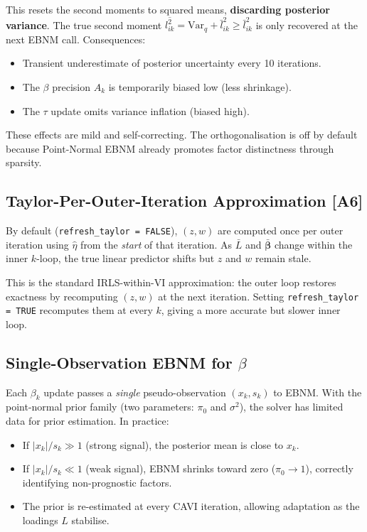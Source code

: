 \documentclass[11pt]{article}
\newcommand{\lbar}[2]{\bar{l}_{#1#2}}
\newcommand{\lsec}[2]{\overline{l^2_{#1#2}}}
\newcommand{\coderef}[1]{{\color{blue!70!black}\texttt{#1}}}
\begin{document}
This resets the second moments to squared means, \textbf{discarding
posterior variance}.  The true second moment
$\lsec{i}{k} = \mathrm{Var}_q + \lbar{i}{k}^2 \geq \lbar{i}{k}^2$
is only recovered at the next EBNM call.  Consequences:
\begin{itemize}[noitemsep]
\item Transient underestimate of posterior uncertainty every 10 iterations.
\item The $\beta$ precision $A_k$ is temporarily biased low (less shrinkage).
\item The $\tau$ update omits variance inflation (biased high).
\end{itemize}

These effects are mild and self-correcting.  The orthogonalisation is
off by default because Point-Normal EBNM already promotes factor
distinctness through sparsity.

\subsection{Taylor-Per-Outer-Iteration Approximation [A6]}

By default (\coderef{refresh\_taylor = FALSE}), $(z, w)$ are computed once
per outer iteration using $\hat{\eta}$ from the \emph{start} of that
iteration.  As $\bar{L}$ and $\bar{\bm{\beta}}$ change within the inner
$k$-loop, the true linear predictor shifts but $z$ and $w$ remain stale.

This is the standard IRLS-within-VI approximation: the outer loop
restores exactness by recomputing $(z, w)$ at the next iteration.
Setting \coderef{refresh\_taylor = TRUE} recomputes them at every $k$,
giving a more accurate but slower inner loop.

\subsection{Single-Observation EBNM for $\beta$}

Each $\beta_k$ update passes a \emph{single} pseudo-observation $(x_k, s_k)$
to EBNM.  With the point-normal prior family (two parameters: $\pi_0$ and
$\sigma^2$), the solver has limited data for prior estimation.  In practice:
\begin{itemize}[noitemsep]
\item If $|x_k|/s_k \gg 1$ (strong signal), the posterior mean is close to $x_k$.
\item If $|x_k|/s_k \ll 1$ (weak signal), EBNM shrinks toward zero
      ($\pi_0 \to 1$), correctly identifying non-prognostic factors.
\item The prior is re-estimated at every CAVI iteration, allowing
      adaptation as the loadings $L$ stabilise.
\end{itemize}
\end{document}
